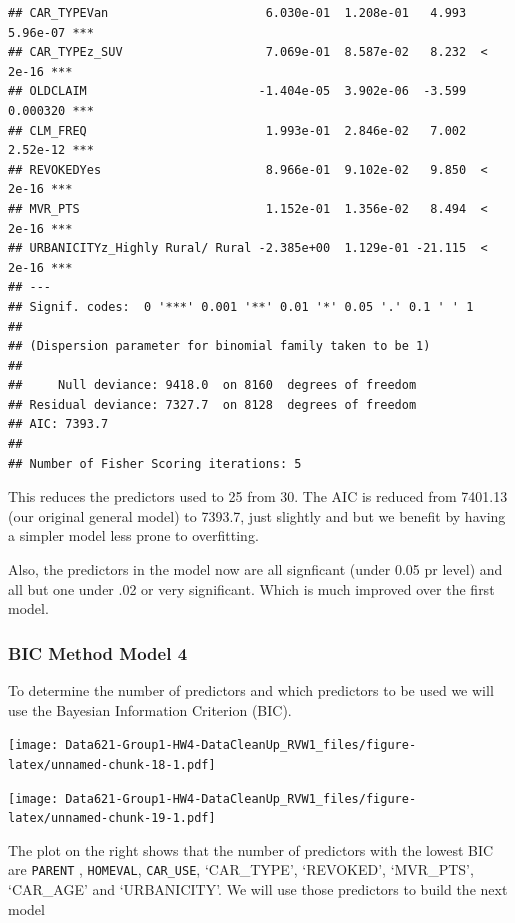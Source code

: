 \documentclass[]{article}
\begin{document}
\begin{verbatim}
## CAR_TYPEVan                      6.030e-01  1.208e-01   4.993 5.96e-07 ***
## CAR_TYPEz_SUV                    7.069e-01  8.587e-02   8.232  < 2e-16 ***
## OLDCLAIM                        -1.404e-05  3.902e-06  -3.599 0.000320 ***
## CLM_FREQ                         1.993e-01  2.846e-02   7.002 2.52e-12 ***
## REVOKEDYes                       8.966e-01  9.102e-02   9.850  < 2e-16 ***
## MVR_PTS                          1.152e-01  1.356e-02   8.494  < 2e-16 ***
## URBANICITYz_Highly Rural/ Rural -2.385e+00  1.129e-01 -21.115  < 2e-16 ***
## ---
## Signif. codes:  0 '***' 0.001 '**' 0.01 '*' 0.05 '.' 0.1 ' ' 1
## 
## (Dispersion parameter for binomial family taken to be 1)
## 
##     Null deviance: 9418.0  on 8160  degrees of freedom
## Residual deviance: 7327.7  on 8128  degrees of freedom
## AIC: 7393.7
## 
## Number of Fisher Scoring iterations: 5
\end{verbatim}

This reduces the predictors used to 25 from 30. The AIC is reduced from
7401.13 (our original general model) to 7393.7, just slightly and but we
benefit by having a simpler model less prone to overfitting.

Also, the predictors in the model now are all signficant (under 0.05 pr
level) and all but one under .02 or very significant. Which is much
improved over the first model.

\subsubsection{BIC Method Model 4}\label{bic-method-model-4}

To determine the number of predictors and which predictors to be used we
will use the Bayesian Information Criterion (BIC).

\texttt{[image: Data621-Group1-HW4-DataCleanUp\_RVW1\_files/figure-latex/unnamed-chunk-18-1.pdf]}

\texttt{[image: Data621-Group1-HW4-DataCleanUp\_RVW1\_files/figure-latex/unnamed-chunk-19-1.pdf]}

The plot on the right shows that the number of predictors with the
lowest BIC are \texttt{PARENT} , \texttt{HOMEVAL}, \texttt{CAR\_USE},
`CAR\_TYPE', `REVOKED', `MVR\_PTS', `CAR\_AGE' and `URBANICITY'. We will
use those predictors to build the next model
\end{document}
